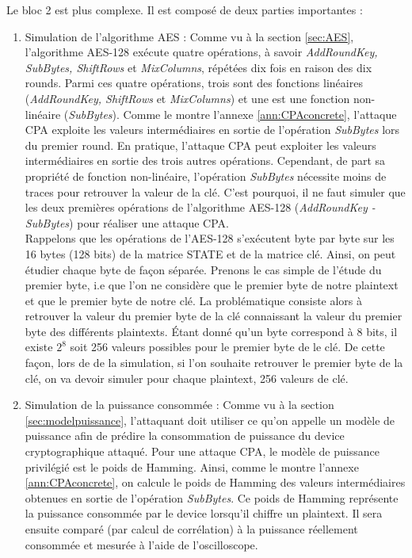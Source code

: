 \documentclass[10pt, oneside, a4paper]{article}
\begin{document}
\hspace{-0.5 cm}Le bloc 2 est plus complexe. Il est composé de deux parties importantes :
\begin{enumerate}
\item Simulation de l'algorithme AES : Comme vu à la section \ref{sec:AES}, l'algorithme AES-128 exécute quatre opérations, à savoir \textit{AddRoundKey, SubBytes, ShiftRows} et \textit{MixColumns}, répétées dix fois en raison des dix rounds. Parmi ces quatre opérations, trois sont des fonctions linéaires (\textit{AddRoundKey, ShiftRows} et \textit{MixColumns}) et une est une fonction non-linéaire (\textit{SubBytes}). Comme le montre l'annexe \ref{ann:CPAconcrete}, l'attaque CPA exploite les valeurs intermédiaires en sortie de l'opération \textit{SubBytes} lors du premier round. En pratique, l'attaque CPA peut exploiter les valeurs intermédiaires en sortie des trois autres opérations. Cependant, de part sa propriété de fonction non-linéaire, l'opération \textit{SubBytes} nécessite moins de traces pour retrouver la valeur de la clé. C'est pourquoi, il ne faut simuler que les deux premières opérations de l'algorithme AES-128 (\textit{AddRoundKey - SubBytes}) pour réaliser une attaque CPA. \\Rappelons que les opérations de l'AES-128 s'exécutent byte par byte sur les 16 bytes (128 bits) de la matrice STATE et de la matrice clé. Ainsi, on peut étudier chaque byte de façon séparée. Prenons le cas simple de l'étude du premier byte, i.e que l'on ne considère que le premier byte de notre plaintext et que le premier byte de notre clé. La problématique consiste alors à retrouver la valeur du premier byte de la clé connaissant la valeur du premier byte des différents plaintexts. Étant donné qu'un byte correspond à 8 bits, il existe $2^8$ soit 256 valeurs possibles pour le premier byte de le clé. De cette façon, lors de de la simulation, si l'on souhaite retrouver le premier byte de la clé, on va devoir simuler pour chaque plaintext, 256 valeurs de clé.
\item Simulation de la puissance consommée : Comme vu à la section \ref{sec:modelpuissance}, l'attaquant doit utiliser ce qu'on appelle un modèle de puissance afin de prédire la consommation de puissance du device cryptographique attaqué. Pour une attaque CPA, le modèle de puissance privilégié est le poids de Hamming. Ainsi, comme le montre l'annexe \ref{ann:CPAconcrete}, on calcule le poids de Hamming des valeurs intermédiaires obtenues en sortie de l'opération \textit{SubBytes}. Ce poids de Hamming représente la puissance consommée par le device lorsqu'il chiffre un plaintext. Il sera ensuite comparé (par calcul de corrélation) à la puissance réellement consommée et mesurée à l'aide de l'oscilloscope. \\
\end{enumerate}
\end{document}
